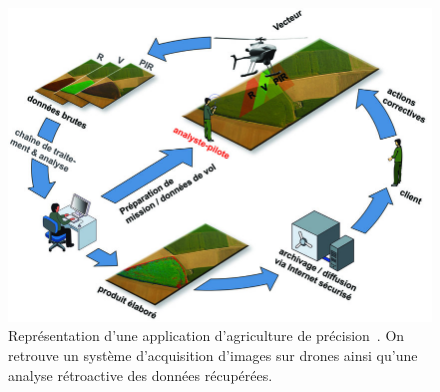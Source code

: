 \begin{figure}
  \begin{center}
    \includegraphics[scale=0.42]{./img/agridrone.jpeg}
  \end{center}
  \caption{Représentation d'une application d'agriculture de 
  précision~\cite{vegedrones}.
  On retrouve un système d'acquisition d'images sur drones ainsi
  qu'une analyse rétroactive des données récupérées.}
  \label{fig:vegedrones}
\end{figure}
